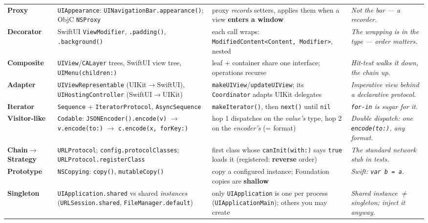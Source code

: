 \documentclass[8pt]{extarticle}
\newcommand\say[1]{\textcolor{sheetBlue}{\emph{#1}}}
\begin{document}
{\begin{tabularx}{\linewidth}{@{}L{16mm}L{50mm}L{53mm}X@{}}
\textbf{Proxy} & \texttt{UIAppearance}: \texttt{UINavigationBar.appearance()}; ObjC
\texttt{NSProxy} & proxy \emph{records} setters, applies them when a view \textbf{enters a
window} & \say{Not the bar — a recorder.} \\
\textbf{Decorator} & SwiftUI \texttt{ViewModifier}, \texttt{.padding()}, \texttt{.background()} &
each call wraps: \texttt{ModifiedContent<Content, Modifier>}, nested & \say{The wrapping is in
the type — order matters.} \\
\textbf{Composite} & \texttt{UIView}/\texttt{CALayer} trees, SwiftUI view tree,
\texttt{UIMenu(children:)} & leaf + container share one interface; operations recurse &
\say{Hit-test walks it down, the chain up.} \\
\textbf{Adapter} & \texttt{UIViewRepresentable} (UIKit$\to$SwiftUI), \texttt{UIHostingController}
(SwiftUI$\to$UIKit) & \texttt{makeUIView}/\texttt{updateUIView}; its \texttt{Coordinator}
adapts UIKit delegates & \say{Imperative view behind a declarative protocol.} \\
\textbf{Iterator} & \texttt{Sequence} + \texttt{IteratorProtocol}, \texttt{AsyncSequence} &
\texttt{makeIterator()}, then \texttt{next()} until \texttt{nil} & \say{\texttt{for-in} is sugar
for it.} \\
\textbf{Visitor-like} & \texttt{Codable}: \texttt{JSONEncoder().encode(v)} $\to$
\texttt{v.encode(to:)} $\to$ \texttt{c.encode(x, forKey:)} & hop 1 dispatches on the
\emph{value's} type, hop 2 on the \emph{encoder's} (= format) & \say{Double dispatch: one
\texttt{encode(to:)}, any format.} \\
\textbf{Chain$\to$Strategy} & \texttt{URLProtocol}; \texttt{config.protocolClasses};
\texttt{URLProtocol.registerClass} & first class whose \texttt{canInit(with:)} says
\texttt{true} loads it (registered: \textbf{reverse} order) & \say{The standard network stub in
tests.} \\
\textbf{Prototype} & \texttt{NSCopying}: \texttt{copy()}, \texttt{mutableCopy()} & copy a
configured instance; Foundation copies are \textbf{shallow} & \say{Swift: \texttt{var b = a}.} \\
\textbf{Singleton} & \texttt{UIApplication.shared} vs shared \emph{instances}
(\texttt{URLSession.shared}, \texttt{FileManager.default}) & only \texttt{UIApplication} is one per
process (\texttt{UIApplicationMain}); others you may create & \say{Shared instance $\neq$
singleton; inject it anyway.} \\
\bottomrule
\end{tabularx}}
\end{document}
